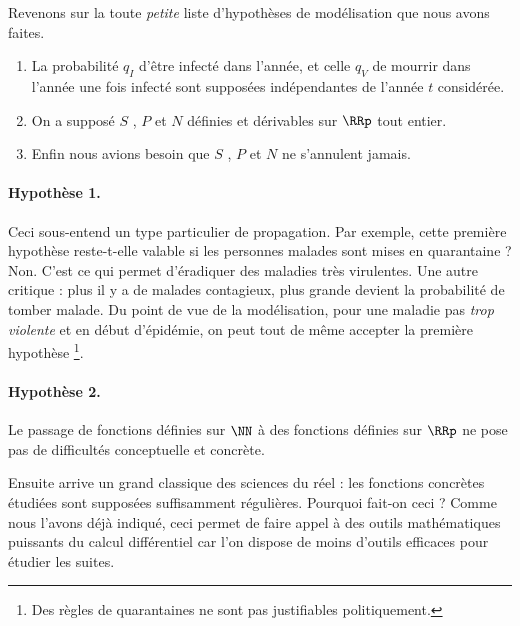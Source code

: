 Revenons sur la toute \emph{\og petite \fg} liste d'hypothèses de modélisation que nous avons faites.

\begin{enumerate}
	\item La probabilité $q_I$ d'être infecté dans l'année, et celle $q_V$ de mourrir dans l'année une fois infecté sont supposées indépendantes de l'année $t$ considérée.

	\item On a supposé $S$ , $P$ et $N$ définies et dérivables sur $\RRp$ tout entier.

	\item Enfin nous avions besoin que $S$ , $P$ et $N$ ne s'annulent jamais.
\end{enumerate}




\paragraph{Hypothèse 1.} Ceci sous-entend un type particulier de propagation.
Par exemple, cette première hypothèse reste-t-elle valable si les personnes malades sont mises en quarantaine ? Non. C'est ce qui permet d'éradiquer des maladies très virulentes.
Une autre critique : plus il y a de malades contagieux, plus grande devient la probabilité de tomber malade. 
Du point de vue de la modélisation, pour une maladie pas \emph{\og trop violente \fg} et en début d'épidémie, on peut tout de même accepter la première hypothèse
\footnote{
	Des règles de quarantaines ne sont pas justifiables politiquement.
}.




\paragraph{Hypothèse 2.} Le passage de fonctions définies sur $\NN$ à des fonctions définies sur $\RRp$ ne pose pas de difficultés conceptuelle et concrète. 

\smallskip

Ensuite arrive un grand classique des sciences du réel : les fonctions concrètes étudiées sont supposées suffisamment régulières. Pourquoi fait-on ceci ? Comme nous l'avons déjà indiqué, ceci permet de faire appel à des outils mathématiques puissants du calcul différentiel car l'on dispose de moins d'outils efficaces pour étudier les suites. 

\smallskip

